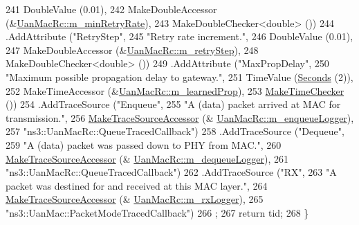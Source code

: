 \begin{DoxyCode}
241                    DoubleValue (0.01),
242                    MakeDoubleAccessor (&\hyperlink{classns3_1_1UanMacRc_a52a16612a3223b250f3e2f8a0941eb6f}{UanMacRc::m\_minRetryRate}),
243                    MakeDoubleChecker<double> ())
244     .AddAttribute (\textcolor{stringliteral}{"RetryStep"},
245                    \textcolor{stringliteral}{"Retry rate increment."},
246                    DoubleValue (0.01),
247                    MakeDoubleAccessor (&\hyperlink{classns3_1_1UanMacRc_a5fceb8ff276883dca8e0060035af3a60}{UanMacRc::m\_retryStep}),
248                    MakeDoubleChecker<double> ())
249     .AddAttribute (\textcolor{stringliteral}{"MaxPropDelay"},
250                    \textcolor{stringliteral}{"Maximum possible propagation delay to gateway."},
251                    TimeValue (\hyperlink{group__timecivil_ga33c34b816f8ff6628e33d5c8e9713b9e}{Seconds} (2)),
252                    MakeTimeAccessor (&\hyperlink{classns3_1_1UanMacRc_a96cb22a43f018604074c8e73e711e9d7}{UanMacRc::m\_learnedProp}),
253                    \hyperlink{group__time_ga7032965bd4afa578691d88c09e4481c1}{MakeTimeChecker} ())
254     .AddTraceSource (\textcolor{stringliteral}{"Enqueue"},
255                      \textcolor{stringliteral}{"A  (data) packet arrived at MAC for transmission."},
256                      \hyperlink{group__tracing_gab21a770b9855af4e8f69f7531ea4a6b0}{MakeTraceSourceAccessor} (&
      \hyperlink{classns3_1_1UanMacRc_ad69b59d9a710aee726e01ab4ce7778a5}{UanMacRc::m\_enqueueLogger}),
257                      \textcolor{stringliteral}{"ns3::UanMacRc::QueueTracedCallback"})
258     .AddTraceSource (\textcolor{stringliteral}{"Dequeue"},
259                      \textcolor{stringliteral}{"A  (data) packet was passed down to PHY from MAC."},
260                      \hyperlink{group__tracing_gab21a770b9855af4e8f69f7531ea4a6b0}{MakeTraceSourceAccessor} (&
      \hyperlink{classns3_1_1UanMacRc_aa9a4d91db1d08882406cbfcabe72ccdf}{UanMacRc::m\_dequeueLogger}),
261                      \textcolor{stringliteral}{"ns3::UanMacRc::QueueTracedCallback"})
262     .AddTraceSource (\textcolor{stringliteral}{"RX"},
263                      \textcolor{stringliteral}{"A packet was destined for and received at this MAC layer."},
264                      \hyperlink{group__tracing_gab21a770b9855af4e8f69f7531ea4a6b0}{MakeTraceSourceAccessor} (&
      \hyperlink{classns3_1_1UanMacRc_ac1ad814ae22d6cea426cc5ca46089856}{UanMacRc::m\_rxLogger}),
265                      \textcolor{stringliteral}{"ns3::UanMac::PacketModeTracedCallback"})
266   ;
267   \textcolor{keywordflow}{return} tid;
268 \}
\end{DoxyCode}


